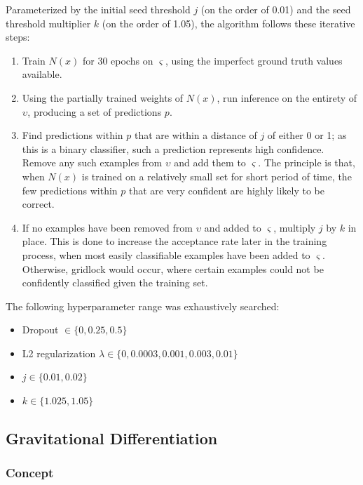 \documentclass[10pt]{article}
\begin{document}
Parameterized by the initial seed threshold $j$ (on the order of 0.01) and the seed threshold multiplier $k$ (on the order of 1.05), the algorithm follows these iterative steps:

\begin{enumerate}
    \item Train $N(x)$ for 30 epochs on $\varsigma$, using the imperfect ground truth values available.
    \item Using the partially trained weights of $N(x)$, run inference on the entirety of $\upsilon$, producing a set of predictions $p$.
    \item Find predictions within $p$ that are within a distance of $j$ of either 0 or 1; as this is a binary classifier, such a prediction represents high confidence. Remove any such examples from $\upsilon$ and add them to $\varsigma$. The principle is that, when $N(x)$ is trained on a relatively small set for short period of time, the few predictions within $p$ that are very confident are highly likely to be correct.
    \item If no examples have been removed from $\upsilon$ and added to $\varsigma$, multiply $j$ by $k$ in place. This is done to increase the acceptance rate later in the training process, when most easily classifiable examples have been added to $\varsigma$. Otherwise, gridlock would occur, where certain examples could not be confidently classified given the training set.
\end{enumerate}

The following hyperparameter range was exhaustively searched:
\begin{itemize}
    \item Dropout $\in \{0, 0.25, 0.5\}$
    \item L2 regularization $\lambda \in \{0, 0.0003, 0.001, 0.003, 0.01\}$
    \item $j \in \{0.01, 0.02\}$
    \item $k \in \{1.025, 1.05\}$
\end{itemize}

\subsection{Gravitational Differentiation}

\subsubsection{Concept}
\end{document}
